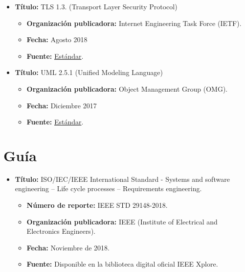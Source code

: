 \begin{itemize}
    \item \textbf{Título:} TLS 1.3. (Transport Layer Security Protocol) 
           \begin{itemize}
               \item \textbf{Organización publicadora:} Internet Engineering Task Force (IETF).
               \item \textbf{Fecha:} Agosto 2018
               \item \textbf{Fuente:} \href{https://datatracker.ietf.org/doc/html/rfc8446 }{Estándar}.
           \end{itemize}
  
    \item \textbf{Título:} UML 2.5.1 (Unified Modeling Language) 
           \begin{itemize}
               \item \textbf{Organización publicadora:} Object Management Group (OMG).
               \item \textbf{Fecha:} Diciembre 2017
               \item \textbf{Fuente:} \href{https://www.omg.org/spec/UML/2.5.1/PDF}{Estándar}.
           \end{itemize}
\end{itemize}


\section{Guía}

\begin{itemize}
    \item \textbf{Título:} ISO/IEC/IEEE International Standard - Systems and software engineering -- Life cycle processes -- Requirements engineering.
        \begin{itemize}
            \item \textbf{Número de reporte:} IEEE STD 29148-2018.
            \item \textbf{Organización publicadora:} IEEE (Institute of Electrical and Electronics Engineers).
            \item \textbf{Fecha:} Noviembre de 2018.
            \item \textbf{Fuente:} Disponible en la biblioteca digital oficial IEEE Xplore.
        \end{itemize}
\end{itemize}